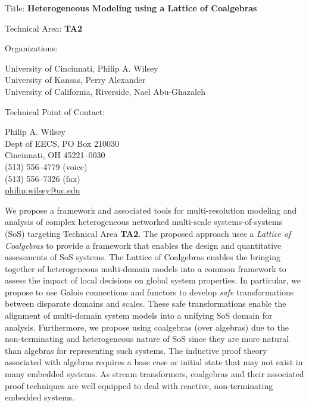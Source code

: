 \documentclass[12pt]{article}
\begin{document}
\noindent
{\Large Title: \textbf{Heterogeneous Modeling using a Lattice of Coalgebras}}

\bigskip
\bigskip
\bigskip
\bigskip
\bigskip

\noindent
Technical Area: \textbf{TA2}

\bigskip
\bigskip
\bigskip
\bigskip

\noindent
Organizations: \begin{minipage}[t]{4in}
  \textsf{University of Cincinnati, Philip A. Wilsey} \\
  \textsf{University of Kansas, Perry Alexander} \\
  \textsf{University of California, Riverside, Nael Abu-Ghazaleh}
\end{minipage}

\bigskip
\bigskip
\bigskip
\bigskip

\noindent
Technical Point of Contact: \begin{minipage}[t]{4in}
  Philip A. Wilsey \\
  Dept of EECS, PO Box 210030 \\
  Cincinnati, OH 45221--0030 \\
  (513) 556--4779 (voice) \\
  (513) 556--7326 (fax) \\
  \url{philip.wilsey@uc.edu}
\end{minipage}

\clearpage


\noindent
We propose a framework and associated tools for multi-resolution modeling and analysis of
complex heterogeneous networked multi-scale systems-of-systems (SoS) targeting Technical
Area \textbf{TA2}.  The proposed approach uses a \emph{Lattice of Coalgebras} to provide a
framework that enables the design and quantitative assessments of SoS systems.  The
Lattice of Coalgebras enables the bringing together of heterogeneous multi-domain models
into a common framework to assess the impact of local decisions on global system
properties.  In particular, we propose to use Galois connections and functors to develop
\emph{safe} transformations between disparate domains and scales.  These safe
transformations enable the alignment of multi-domain system models into a unifying SoS
domain for analysis.  Furthermore, we propose using coalgebras (over algebras) due to the
non-terminating and heterogeneous nature of SoS since they are more natural than algebras
for representing such systems.  The inductive proof theory associated with algebras
requires a base case or initial state that may not exist in many embedded systems.  As
stream transformers, coalgebras and their associated proof techniques are well equipped to
deal with reactive, non-terminating embedded systems.
\end{document}
